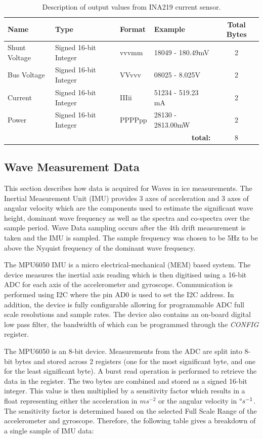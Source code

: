 \begin{table}[H]
	\centering
	\caption{Description of output values from INA219 current sensor.}
	\begin{tabular}{|l|l|l|l|c|}
		\hline
		\textbf{Name }& \textbf{Type} &\textbf{Format} & \textbf{Example} & \textbf{Total Bytes} \\
		\hline
		Shunt Voltage & Signed 16-bit Integer & vvvmm & 18049 - 180.49mV & 2 \\
		\hline
		Bus Voltage & Signed 16-bit Integer & VVvvv & 08025 - 8.025V & 2 \\
		\hline
		Current & Signed 16-bit Integer & IIIii & 51234 - 519.23 mA & 2 \\
		\hline
		Power & Signed 16-bit Integer & PPPPpp &  28130 - 2813.00mW & 2 \\
		\hline
		\multicolumn{4}{r}{\textbf{total:}} & \multicolumn{1}{c}{8}\\
		\cline{5-5}
		\cline{5-5}
	\end{tabular}
	
	\label{tab:INA_Output}
\end{table}

\subsection{Wave Measurement Data}

This section describes how data is acquired for Waves in ice measurements. The Inertial Measurement Unit (IMU) provides 3 axes of acceleration and 3 axes of angular velocity which are the components used to estimate the significant wave height, dominant wave frequency as well as the spectra and co-spectra over the sample period. Wave Data sampling occurs after the 4th drift measurement is taken and the IMU is sampled. The sample frequency was chosen to be 5Hz to be above the Nyquist frequency of the dominant wave frequency.\par 

The MPU6050 IMU is a micro electrical-mechanical (MEM) based system. The device measures the inertial axis reading which is then digitised using a 16-bit ADC for each axis of the accelerometer and gyroscope. Communication is performed using I2C where the pin AD0 is used to set the I2C address. In addition, the device is fully configurable allowing for programmable ADC full scale resolutions and sample rates. The device also contains an on-board digital low pass filter, the bandwidth of which can be programmed through the \textit{CONFIG} register.\par 
The MPU6050 is an 8-bit device. Measurements from the ADC are split into 8-bit bytes and stored across 2 registers (one for the most significant byte, and one for the least significant byte). A burst read operation is performed to retrieve the data in the register. The two bytes are combined and stored as a signed 16-bit integer. This value is then multiplied by a sensitivity factor which results in a float representing either the acceleration in $ms^{-2}$ or the angular velocity in $\degree s^{-1}$. The sensitivity factor is determined based on the selected Full Scale Range of the accelerometer and gyroscope. Therefore, the following table gives a breakdown of a single sample of IMU data:

